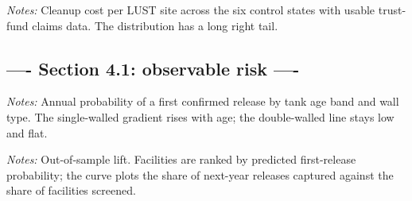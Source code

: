 \documentclass[
  12pt,
]{article}
\begin{document}
\clearpage
\null\vfill
\begin{center}
\label{fig-cost-distribution}
\par\vspace{8pt}
\par\vspace{8pt}
\begin{minipage}{0.85\textwidth}\small\textit{Notes:} Cleanup cost per LUST site across the six control states with usable trust-fund claims data. The distribution has a long right tail.\end{minipage}
\end{center}
\vfill\clearpage

\subsection{---- Section 4.1: observable risk
----}\label{section-4.1-observable-risk--}

\clearpage
\null\vfill
\begin{center}
\label{fig-cell-risk}
\par\vspace{8pt}
\par\vspace{8pt}
\begin{minipage}{0.85\textwidth}\small\textit{Notes:} Annual probability of a first confirmed release by tank age band and wall type. The single-walled gradient rises with age; the double-walled line stays low and flat.\end{minipage}
\end{center}
\vfill\clearpage

\clearpage
\null\vfill
\begin{center}
\label{fig-lift}
\par\vspace{8pt}
\par\vspace{8pt}
\begin{minipage}{0.85\textwidth}\small\textit{Notes:} Out-of-sample lift. Facilities are ranked by predicted first-release probability; the curve plots the share of next-year releases captured against the share of facilities screened.\end{minipage}
\end{center}
\vfill\clearpage
\end{document}
